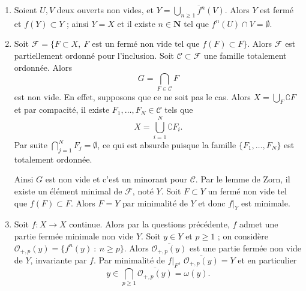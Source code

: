 \documentclass[a4paper,12pt,openany]{article}
\theoremstyle{plain}
\theoremstyle{definition}
\newcommand{\N}{\mathbf{N}}
\begin{document}
\begin{enumerate}
\item Soient $U,V$ deux ouverts non vides, et $Y = \overline{\bigcup_{n \geqslant 1} f^{n}(V)}.$ Alors $Y$ est ferm\'e et $f(Y) \subset Y$ ; ainsi $Y=X$ et il existe $n \in \N$ tel que $f^{n}(U) \cap V = \emptyset$.
\item Soit 
$
\mathcal{F} = \{F \subset X,~ F \text{ est un ferm\'e non vide tel que } f(F) \subset F\}.
$
Alors $\mathcal{F}$ est partiellement ordonn\'e pour l'inclusion. Soit $\mathcal{C} \subset \mathcal{F}$ une famille totalement ordonn\'ee. Alors
$$
G = \bigcap_{F \in \mathcal{C}} F
$$
est non vide. En effet, supposons que ce ne soit pas le cas. Alors $X = \bigcup_F \complement F$ et par compacit\'e, il existe $F_1, \dots, F_N \in \mathcal{C}$ tels que
$$
X = \bigcup_{i = 1}^N \complement F_i.
$$
Par suite $\bigcap_{j=1}^N F_j = \emptyset$, ce qui est absurde puisque la famille $\{F_1, \dots, F_N\}$ est totalement ordonn\'ee. 

Ainsi $G$ est non vide et c'est un minorant pour $\mathcal{C}$. Par le lemme de Zorn, il existe un \'el\'ement minimal de $\mathcal{F}$, not\'e $Y$. Soit $F \subset Y$ un ferm\'e non vide tel que $f(F) \subset F$. Alors $F = Y$ par minimalit\'e de $Y$ et donc $f|_Y$ est minimale.
\item Soit $f : X \to X$ continue. Alors par la questions pr\'ec\'edente, $f$ admet une partie ferm\'ee minimale non vide $Y$. Soit $y \in Y$ et $p \geqslant 1$ ; on consid\`ere
$
\mathcal{O}_{+,p}(y) = \{f^n(y)~:~n \geqslant p\}.
$
Alors $\overline{\mathcal{O}_{+,p}(y)}$ est une partie ferm\'ee non vide de $Y$, invariante par $f$. Par minimalit\'e de $f|_F$, $\overline{\mathcal{O}_{+,p}(y)} = Y$ et en particulier 
$$
\displaystyle{
y \in \bigcap_{p \geqslant 1} \overline{\mathcal{O}_{+, p}(y)} = \omega(y).
}
$$
\end{enumerate}
\vspace{0.6cm}

 \vspace{1.5mm} 
\end{document}
